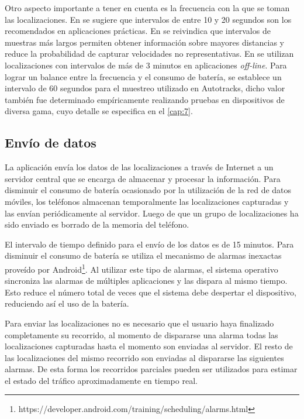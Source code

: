 Otro aspecto importante a tener en cuenta es la frecuencia con la que se toman las localizaciones. En \cite{tao2012real} se sugiere que intervalos de entre 10 y 20 segundos son los recomendados en aplicaciones prácticas. En \cite{fontaine2005part} se reivindica que intervalos de muestras más largos permiten obtener información sobre mayores distancias y reduce la probabilidad de capturar velocidades no representativas. En \cite{lou2009map,giovannini2011novel} se utilizan localizaciones con intervalos de más de 3 minutos en aplicaciones \emph{off-line}. Para lograr un balance entre la frecuencia y el consumo de batería, se establece un intervalo de 60 segundos para el muestreo utilizado en Autotracks, dicho valor también fue determinado empíricamente realizando pruebas en dispositivos de diversa gama, cuyo detalle se especifica en el \cref{cap:7}.

\subsection{Envío de datos}

La aplicación envía los datos de las localizaciones a través de Internet a un servidor central que se encarga de almacenar y procesar la información. Para disminuir el consumo de batería ocasionado por la utilización de la red de datos móviles, los teléfonos almacenan temporalmente las localizaciones capturadas y las envían periódicamente al servidor. Luego de que un grupo de localizaciones ha sido enviado es borrado de la memoria del teléfono.

El intervalo de tiempo definido para el envío de los datos es de 15 minutos. Para disminuir el consumo de batería se utiliza el mecanismo de alarmas inexactas proveído por Android\footnote{https://developer.android.com/training/scheduling/alarms.html}. Al utilizar este tipo de alarmas, el sistema operativo sincroniza las alarmas de múltiples aplicaciones y las dispara al mismo tiempo. Esto reduce el número total de veces que el sistema debe despertar el dispositivo, reduciendo así el uso de la batería.

Para enviar las localizaciones no es necesario que el usuario haya finalizado completamente su recorrido, al momento de dispararse una alarma todas las localizaciones capturadas hasta el momento son enviadas al servidor. El resto de las localizaciones del mismo recorrido son enviadas al dispararse las siguientes alarmas. De esta forma los recorridos parciales pueden ser utilizados para estimar el estado del tráfico aproximadamente en tiempo real.

